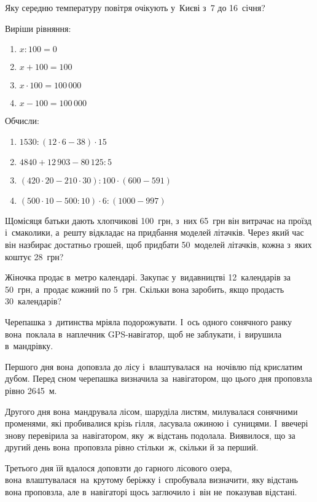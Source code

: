 Яку середню температуру повітря очікують у~Києві з~7 до 16~січня?


\problem
Виріши рівняння:
\begin{multicols}{2}
  \begin{enumerate}
    \item $x : 100 = 0$
    \item $x + 100 = 100$
    \item $x \cdot 100 = 100\,000$
    \item $x - 100 = 100\,000$
  \end{enumerate}
\end{multicols}


\problem
Обчисли:
\begin{enumerate}
  \item $1530 : (12 \cdot 6 - 38) \cdot 15$
  \item $4840 + 12\,903 - 80\,125 : 5$
  \item $(420 \cdot 20 - 210 \cdot 30) : 100 \cdot (600 - 591)$
  \item $(500 \cdot 10 - 500 : 10) \cdot 6 : (1000 - 997)$
\end{enumerate}


\problem
Щомісяця батьки дають хлопчикові 100~грн, з~них 65~грн він витрачає
на проїзд і~смаколики, а~решту відкладає на придбання моделей літачків.
Через який час він назбирає достатньо грошей, щоб придбати 50~моделей літачків,
кожна з~яких коштує 28~грн?


\problem
Жіночка продає в~метро календарі.
Закупає у~видавництві 12~календарів за 50~грн, а~продає кожний по 5~грн.
Скільки вона заробить, якщо продасть 30~календарів?


\problem
Черепашка з~дитинства мріяла подорожувати. І~ось одного сонячного ранку
вона поклала в~наплечник GPS-навігатор, щоб не заблукати,
і~вирушила в~мандрівку.

Першого дня вона доповзла до лісу і~влаштувалася на ночівлю під крислатим
дубом. Перед сном черепашка визначила за навігатором, що цього дня
проповзла рівно 2645~м.

Другого дня вона мандрувала лісом, шаруділа листям, милувалася сонячними
променями, які пробивалися крізь гілля, ласувала ожиною і~суницями.
І~ввечері знову перевірила за навігатором, яку~ж відстань подолала.
Виявилося, що за другий день вона проповзла рівно стільки~ж,
скільки й за перший.

Третього дня їй вдалося доповзти до гарного лісового озера,
вона влаштувалася на крутому беріжку і~спробувала визначити,
яку відстань вона проповзла, але в~навігаторі щось заглючило
і~він не~показував відстані.

